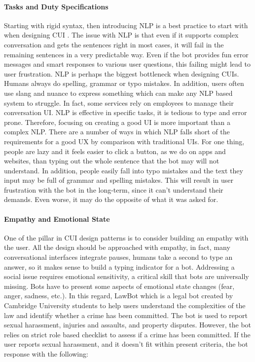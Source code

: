 \paragraph{Tasks and Duty Specifications}
Starting with rigid syntax, then introducing NLP is a best practice to start with when designing CUI \cite{fadhil2018}. The issue with NLP is that even if it supports complex conversation and gets the sentences right in most cases, it will fail in the remaining sentences in a very predictable way. Even if the bot provides fun error messages and smart responses to various user questions, this failing might lead to user frustration. NLP is perhaps the biggest bottleneck when designing CUIs. Humans always do spelling, grammar or typo mistakes. In addition, users often use slang and nuance to express something which can make any NLP based system to struggle. In fact, some services rely on employees to manage their conversation UI. NLP is effective in specific tasks, it is tedious to type and error prone. Therefore, focusing on creating a good UI is more important than a complex NLP. There are a number of ways in which NLP falls short of the requirements for a good UX by comparison with traditional UIs. For one thing, people are lazy and it feels easier to click a button, as we do on apps and websites, than typing out the whole sentence that the bot may will not understand. In addition, people easily fall into typo mistakes and the text they input may be full of grammar and spelling mistakes. This will result in user frustration with the bot in the long-term, since it can't understand their demands. Even worse, it may do the opposite of what it was asked for.


\paragraph{Empathy and Emotional State}
One of the pillar in CUI design patterns is to consider building an empathy with the user. All the design should be approached with empathy, in fact, many conversational interfaces integrate pauses, humans take a second to type an answer, so it makes sense to build a typing indicator for a bot. Addressing a social issue requires emotional sensitivity, a critical skill that bots are universally missing. Bots have to present some aspects of emotional state changes (fear, anger, sadness, etc.). In this regard, LawBot \cite{lawbot} which is a legal bot created by Cambridge University students to help users understand the complexities of the law and identify whether a crime has been committed. The bot is used to report sexual harassment, injuries and assaults, and property disputes. However, the bot relies on strict role based checklist to assess if a crime has been committed. If the user reports sexual harassment, and it doesn't fit within present criteria, the bot response with the following:\\

